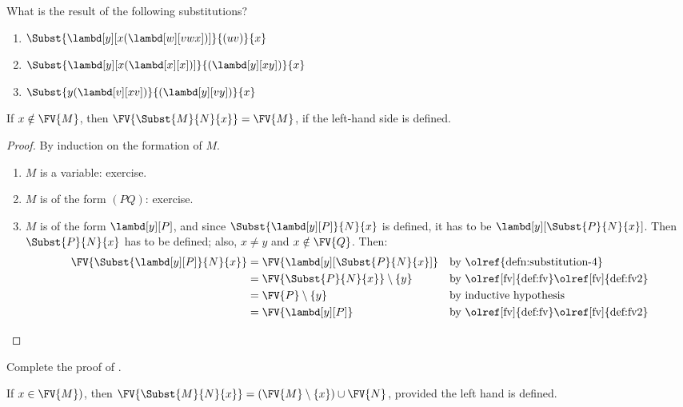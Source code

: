 \documentclass[../../../include/open-logic-section]{subfiles}
\begin{document}
\begin{prob}
  What is the result of the following substitutions?
  \begin{enumerate}
  \item $\Subst{\lambd[y][x(\lambd[w][vwx])]}{(uv)}{x}$
  \item $\Subst{\lambd[y][x(\lambd[x][x])]}{(\lambd[y][xy])}{x}$
  \item $\Subst{y(\lambd[v][xv])}{(\lambd[y][vy])}{x}$
  \end{enumerate}
\end{prob}

\begin{thm} 
  If $x \notin \FV{M}$, then $\FV{\Subst{M}{N}{x}} = \FV{M}$, if
  the left-hand side is defined.
\end{thm}

\begin{proof}
  By induction on the formation of $M$.
  \begin{enumerate}
  \item $M$ is a variable: exercise.
  \item $M$ is of the form $(PQ)$: exercise.
  \item $M$ is of the form $\lambd[y][P]$, and since
    $\Subst{\lambd[y][P]}{N}{x}$ is defined, it has to be
    $\lambd[y][\Subst{P}{N}{x}]$. Then $\Subst{P}{N}{x}$ has to be
    defined; also, $x \neq y$ and $x \notin \FV{Q}$. Then:
    \begin{align*}
      \FV{\Subst{\lambd[y][P]}{N}{x}}
      & = \FV{\lambd[y][\Subst{P}{N}{x}]} &&
      \text{by \olref{defn:substitution-4}}\\
      & = \FV{\Subst{P}{N}{x}} \setminus \{y\} &&
      \text{by \olref[fv]{def:fv}\olref[fv]{def:fv2}}\\
      & = \FV{P} \setminus \{y\} && \text{by inductive hypothesis} \\
      & = \FV{\lambd[y][P]} && \text{by \olref[fv]{def:fv}\olref[fv]{def:fv2}}
    \end{align*}
  \end{enumerate}
\end{proof}

\begin{prob}
  Complete the proof of .
\end{prob}

\begin{thm} 
  If $x \in \FV{M})$, then $\FV{\Subst{M}{N}{x}} = (\FV{M} \setminus
  \{x\}) \cup \FV{N}$, provided the left hand is defined.
\end{thm}
\end{document}
